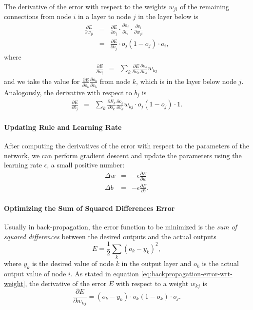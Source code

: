 The derivative of the error with respect to the weights $w_{ji}$
of the remaining connections from node $i$ in a layer to node $j$
in the layer below is
\begin{eqnarray*}
\frac{\partial E}{\partial w_{ji}} & = & \frac{\partial E}{\partial o_{j}}\cdot\frac{\partial o_{j}}{\partial v_{i}}\cdot\frac{\partial v_{i}}{\partial w_{ji}}\\
 & = & \frac{\partial E}{\partial o_{j}}\cdot o_{j}(1-o_{j})\cdot o_{i},
\end{eqnarray*}
 where
\begin{eqnarray*}
\frac{\partial E}{\partial o_{j}} & = & \sum_{k}\frac{\partial E}{\partial o_{k}}\frac{\partial o_{k}}{\partial v_{k}}w_{kj}
\end{eqnarray*}
and we take the value for $\frac{\partial E}{\partial o_{k}}\frac{\partial o_{k}}{\partial v_{k}}$
from node $k$, which is in the layer below node $j$. Analogously,
the derivative with respect to $b_{j}$ is 
\begin{eqnarray*}
\frac{\partial E}{\partial b_{j}} & = & \sum_{k}\frac{\partial E_{k}}{\partial o_{k}}\frac{\partial o_{k}}{\partial v_{k}}w_{kj}\cdot o_{j}(1-o_{j})\cdot1.
\end{eqnarray*}

\paragraph{Updating Rule and Learning Rate}

After computing the derivatives of the error with respect to the parameters
of the network, we can perform gradient descent and update the parameters
using the learning rate $\epsilon$, a small
positive number:
\begin{eqnarray}
\Delta w & = & -\epsilon\frac{\partial E}{\partial w}\label{eq:backpropagation-deltas}\\
\Delta b & = & -\epsilon\frac{\partial E}{\partial b}.\nonumber 
\end{eqnarray}

\paragraph{Optimizing the Sum of Squared Differences Error\label{par:Optimizing-the-Sum-of-Squared-DIfferences}}

Usually in back-propagation, the error function to be minimized is
the \emph{sum of squared differences}
between the desired outputs and the actual outputs
\[
E=\frac{1}{2}\sum_{k}(o_{k}-y_{k})^{2},
\]
 where $y_{k}$ is the desired value of node $k$ in the output layer
and $o_{k}$ is the actual output value of node $i$. As stated in
equation \ref{eq:backpropagation-error-wrt-weight}, the derivative
of the error $E$ with respect to a weight $w_{kj}$ is
\begin{equation}
\frac{\partial E}{\partial w_{kj}}=(o_{k}-y_{k})\cdot o_{k}(1-o_{k})\cdot o_{j}.\label{eq:backpropagation-error-wrt-weight-1}
\end{equation}

